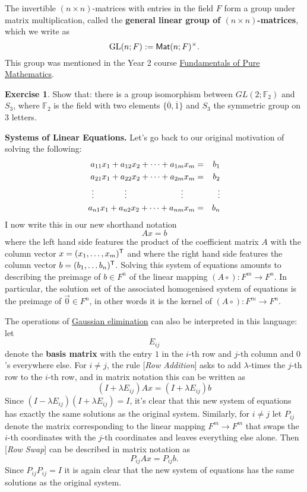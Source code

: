 \documentclass[11pt]{amsbook}
\theoremstyle{definition}
\newtheorem{exercise}{Exercise}
\begin{document}
The invertible $(n\times n)$-matrices with entries in the field $F$ form a group under matrix multiplication, called the {\bf general linear group of $(n\times n)$-matrices}, which we write as
\label{genlin}
\begin{equation*}
{\rm GL}(n; F) := {\sf Mat}(n; F)^{\times}.
\end{equation*} This group was mentioned in the Year 2 course \href{http://www.drps.ed.ac.uk/12-13/dpt/cxmath08064.htm}{Fundamentals of Pure Mathematics}.

\begin{exercise} Show that: there is a group isomorphism between $GL(2; \mathbb{F}_2)$ and $S_3$, where $\mathbb{F}_2$ is the field with two elements $\{ \overline{0}, \overline{1} \}$ and $S_3$ the symmetric group on $3$ letters.
\end{exercise}
\medskip

\noindent
{\bf Systems of Linear Equations.}
Let's go back to our original motivation of solving the following:
\begin{eqnarray*}
      a_{11} x_1 + a_{12}x_2 +  \cdots  + a_{1m}x_m & =  & b_1 \\
      a_{21} x_1 + a_{22}x_2 +  \cdots  + a_{2m}x_m & = & b_2 \\
      \vdots  \hspace{13mm} \vdots \hspace{23mm} \vdots \hspace{5mm} &&  \, \vdots \\
      a_{n1} x_1 + a_{n2}x_2 + \cdots  + a_{nm}x_m & =  & b_n
\end{eqnarray*}
I now write this in our new shorthand notation $$A x = b$$ where the left hand side features the product of the coefficient matrix $A$ with the column vector $x = (x_1, \ldots , x_m)^{\sf T}$ and where the right hand side features the column vector $b = (b_1, \ldots b_n)^{\sf T}$. Solving this system of equations amounts to describing the preimage of $b\in F^n$ of the linear mapping $(A\circ): F^m \to F^n$. In particular, the solution set of the associated homogenised system of equations is the preimage of $\vec{0}\in F^n$, in other words it is the kernel of $(A\circ): F^m \to F^n$.

The operations of \hyperref[opGE]{Gaussian elimination} can also be interpreted in this language: let $$E_{ij}$$ denote the {\bf basis matrix} with the entry $1$ in the $i$-th row and $j$-th column and $0$'s everywhere else. For $i\neq j$, the rule [{\it Row Addition}] asks to add $\lambda$-times the $j$-th row to the $i$-th row, and in matrix notation this can be written as $$(I + \lambda E_{ij})Ax = (I + \lambda E_{ij})b$$ Since $(I-\lambda E_{ij})(I+\lambda E_{ij}) = I$, it's clear that this new system of equations has exactly the same solutions as the original system. Similarly, for $i\neq j$ let $P_{ij}$ denote the matrix corresponding to the linear mapping $F^m \to F^m$ that swaps the $i$-th coordinates with the $j$-th coordinates and leaves everything else alone. Then [{\it Row Swap}] can be described in matrix notation as $$P_{ij} Ax = P_{ij}b.$$ Since $P_{ij}P_{ij} = I$ it is again clear that the new system of equations has the same solutions as the original system.
\end{document}
